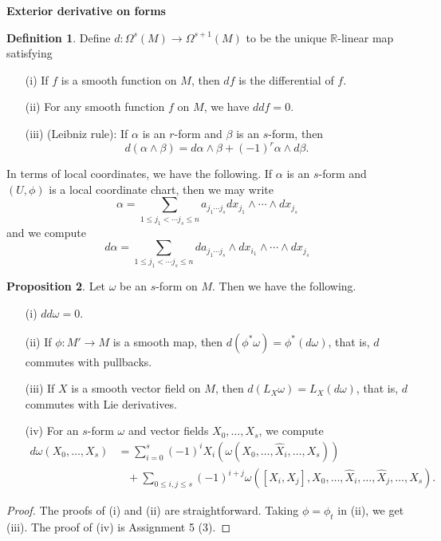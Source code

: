 \documentclass{amsart}
\numberwithin{equation}{section}
\theoremstyle{definition}
\newtheorem{definition}{Definition} [section]
\theoremstyle{theorem}
\newtheorem{proposition}[definition]{Proposition}
\begin{document}
\noindent
{\large \bf Exterior derivative on forms}


\begin{definition}
Define $d : \Omega^s(M) \to \Omega^{s+1}(M)$ to be the unique $\mathbb{R}$-linear map satisfying 
\begin{enumerate}
\item[(i)] If $f$ is a smooth function on $M$, then $df$ is the differential of $f$. 
\item[(ii)] For any smooth function $f$ on $M$, we have $ddf = 0$. 
\item[(iii)] (Leibniz rule): If $\alpha$ is an $r$-form and $\beta$ is an $s$-form, then 
\[
d(\alpha \wedge \beta) = d\alpha \wedge \beta + (-1)^r \alpha \wedge d\beta. 
\]
\end{enumerate}
\end{definition}

In terms of local coordinates, we have the following. If $\alpha$ is an $s$-form and $(U,\phi)$ is a local coordinate chart, then we may write 
\[
\alpha = \sum_{1 \le j_1 < \cdots j_s \le n} a_{j_1 \cdots j_s} dx_{j_1} \wedge \cdots \wedge dx_{j_s}
\]
and we compute 
\[
d\alpha =  \sum_{1 \le j_1 < \cdots j_s \le n} da_{j_1 \cdots j_s} \wedge dx_{i_1} \wedge \cdots \wedge dx_{j_s}
\]

\begin{proposition}
Let $\omega$ be an $s$-form on $M$. Then we have the following. 
\begin{enumerate}
\item[(i)]  $dd\omega = 0$. 
\item[(ii)] If $\phi : M' \to M$ is a smooth map, then $d(\phi^*\omega) = \phi^*(d \omega)$, that is, $d$ commutes with pullbacks. 
\item[(iii)] If $X$ is a smooth vector field on $M$, then $d(L_X\omega) = L_X(d\omega)$, that is, $d$ commutes with Lie derivatives. 
\item[(iv)] For an $s$-form $\omega$ and vector fields $X_0, \ldots, X_s$, we compute 
\begin{align*}
d\omega(X_0, \ldots, X_s) &= \sum_{i=0}^s (-1)^iX_i(\omega(X_0, \ldots, \hat{X}_i, \ldots, X_s)) \\
&\;\;\;+ \sum_{0 \le i, j \le s}(-1)^{i+j} \omega([X_i, X_j], X_0, \ldots, \hat{X}_i, \ldots, \hat{X}_j, \ldots, X_s). 
\end{align*}
\end{enumerate}
\end{proposition}

\begin{proof}
The proofs of (i) and (ii) are straightforward. Taking $\phi = \phi_t$ in (ii), we get (iii). The proof of (iv) is Assignment 5 (3). 
\end{proof}
\end{document}
